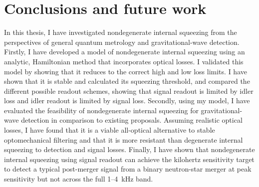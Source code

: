 \chapter{Conclusions and future work}
\label{chp:future_work_and_conclusions}

In this thesis, I have investigated nondegenerate internal squeezing from the perspectives of general quantum metrology	and gravitational-wave detection.
Firstly, I have developed a model of nondegenerate internal squeezing using an analytic, Hamiltonian method that incorporates optical losses. I validated this model by showing that it reduces to the correct high and low loss limits. I have shown that it is stable and calculated its squeezing threshold, and compared the different possible readout schemes, showing that signal readout is limited by idler loss and idler readout is limited by signal loss.
Secondly, using my model, I have evaluated the feasibility of nondegenerate internal squeezing for gravitational-wave detection in comparison to existing proposals. Assuming realistic optical losses, I have found that it is a viable all-optical alternative to stable optomechanical filtering and that it is more resistant than degenerate internal squeezing to detection and signal losses. %
Finally, I have shown that nondegenerate internal squeezing using signal readout can achieve the kilohertz sensitivity target to detect a typical post-merger signal from a binary neutron-star merger at peak sensitivity but not across the full 1--4~kHz band. %
